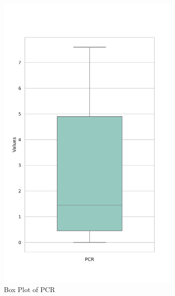 \documentclass[jou]{apa7}
\begin{document}
\begin{figure}[H]
	\centering
	
	\begin{subfigure}[b]{0.45\linewidth}
		\centering
		\includegraphics[width=\linewidth]{Box_Plot_of_PCR.pdf}
		\caption{Box Plot of PCR}
		\label{fig:BoxPlotPCR}
	\end{subfigure}
	\hfill
	\begin{subfigure}[b]{0.45\linewidth}
		\centering

\end{subfigure}
\end{figure}
\end{document}

